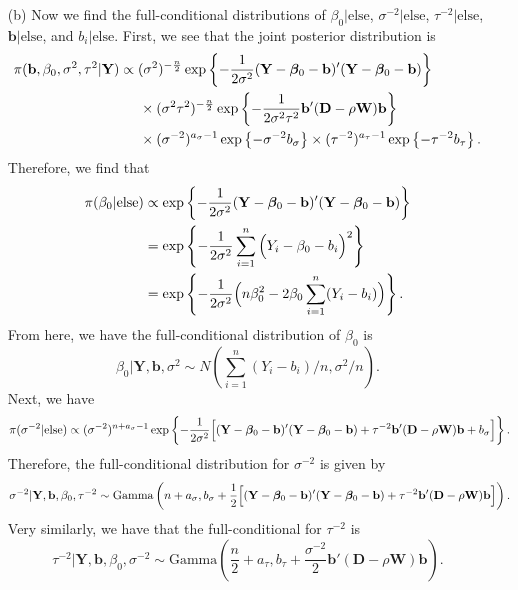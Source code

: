 \documentclass[11pt]{article}
\begin{document}
\begin{itemize}
\item[(b)]  Now we find the full-conditional distributions of $\beta_0|\text{else}$, $\sigma^{-2}|\text{else}$, $\tau^{-2}|\text{else}$, $\mathbf{b}|\text{else}$, and $b_i|\text{else}$.  First, we see that the joint posterior distribution is
\begin{align*}
\pi(\mathbf{b},\beta_0,\sigma^2,\tau^2|\mathbf{Y}) &\propto (\sigma^2)^{-\frac{n}{2}}\exp\left\{-\frac{1}{2\sigma^2}(\mathbf{Y}-\boldsymbol\beta_0 - \mathbf{b})'(\mathbf{Y}-\boldsymbol\beta_0 - \mathbf{b})\right\} \\
&\hspace{5mm}\times (\sigma^2\tau^2)^{-\frac{n}{2}}\exp\left\{-\frac{1}{2\sigma^2\tau^2}\mathbf{b}'(\mathbf{D}-\rho\mathbf{W})\mathbf{b}\right\} \\
&\hspace{5mm}\times (\sigma^{-2})^{a_\sigma-1}\exp\left\{-\sigma^{-2}b_\sigma\right\}\times (\tau^{-2})^{a_\tau - 1}\exp\left\{-\tau^{-2}b_\tau\right\}.
\end{align*}
Therefore, we find that
\begin{align*}
\pi(\beta_0|\text{else}) &\propto \exp\left\{-\frac{1}{2\sigma^2}(\mathbf{Y}-\boldsymbol\beta_0 - \mathbf{b})'(\mathbf{Y}-\boldsymbol\beta_0 - \mathbf{b})\right\} \\
&= \exp\left\{-\frac{1}{2\sigma^2}\sum_{i=1}^n\Big{(} Y_i - \beta_0 - b_i\Big{)}^2\right\} \\
&= \exp\left\{-\frac{1}{2\sigma^2}\Big{(}n\beta_0^2 - 2\beta_0\sum_{i=1}^n(Y_i-b_i)\Big{)}\right\}.
\end{align*}
From here, we have the full-conditional distribution of $\beta_0$ is
\[
\beta_0|\mathbf{Y},\mathbf{b},\sigma^2 \sim N\left(\sum_{i=1}^n(Y_i-b_i)/n,\sigma^2/n\right).
\]
Next, we have
\[
\pi(\sigma^{-2}|\text{else}) \propto (\sigma^{-2})^{n + a_\sigma - 1}\exp\left\{-\frac{1}{2\sigma^2}\Big{[}(\mathbf{Y}-\boldsymbol\beta_0 - \mathbf{b})'(\mathbf{Y}-\boldsymbol\beta_0 - \mathbf{b}) + \tau^{-2}\mathbf{b}'(\mathbf{D}-\rho\mathbf{W})\mathbf{b} + b_\sigma\Big{]}\right\}.
\]
Therefore, the full-conditional distribution for $\sigma^{-2}$ is given by
\[
\sigma^{-2}|\mathbf{Y},\mathbf{b},\beta_0,\tau^{-2} \sim \text{Gamma}\left(n+a_\sigma,b_\sigma+ \frac{1}{2}\Big{[}(\mathbf{Y}-\boldsymbol\beta_0 - \mathbf{b})'(\mathbf{Y}-\boldsymbol\beta_0 - \mathbf{b}) + \tau^{-2}\mathbf{b}'(\mathbf{D}-\rho\mathbf{W})\mathbf{b}\Big{]}\right).
\]
Very similarly, we have that the full-conditional for $\tau^{-2}$ is
\[
\tau^{-2}|\mathbf{Y},\mathbf{b},\beta_0,\sigma^{-2}\sim\text{Gamma}\left(\frac{n}{2}+a_\tau,b_\tau + \frac{\sigma^{-2}}{2}\mathbf{b}'(\mathbf{D}-\rho\mathbf{W})\mathbf{b}\right).
\]
\end{itemize}
\end{document}

